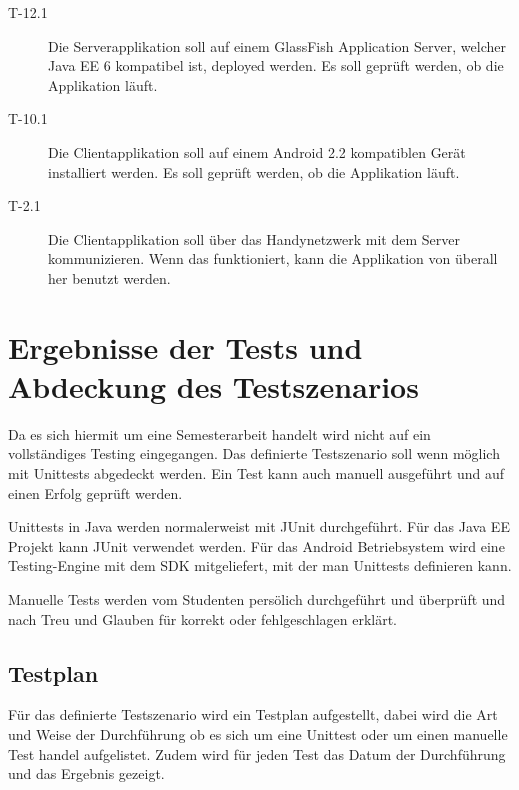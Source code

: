 \documentclass[listof=totocnumbered, bibliography=totocnumbered]{scrreprt}
\begin{document}
\begin{description}
    \item[T-12.1] Die Serverapplikation soll auf einem GlassFish Application
    Server, welcher Java EE 6 kompatibel ist, deployed werden. Es soll geprüft
    werden, ob die Applikation läuft.
         
    \item[T-10.1] Die Clientapplikation soll auf einem Android 2.2
    kompatiblen Gerät installiert werden. Es soll geprüft werden, ob die
    Applikation läuft.
    
    \item[T-2.1] Die Clientapplikation soll über das Handynetzwerk mit dem
    Server kommunizieren. Wenn das funktioniert, kann die Applikation von
    überall her benutzt werden.
    
  \end{description}
  
  \newpage
  
  \section{Ergebnisse der Tests und Abdeckung des Testszenarios}
  
  Da es sich hiermit um eine Semesterarbeit handelt wird nicht auf ein
  vollständiges Testing eingegangen. Das definierte Testszenario soll wenn
  möglich mit Unittests abgedeckt werden. Ein Test kann auch manuell ausgeführt
  und auf einen Erfolg geprüft werden.
  
  Unittests in Java werden normalerweist mit JUnit durchgeführt. Für das Java
  EE Projekt kann JUnit verwendet werden. Für das Android Betriebsystem wird
  eine Testing-Engine mit dem SDK mitgeliefert, mit der man Unittests definieren kann.
  
  Manuelle Tests werden vom Studenten persölich durchgeführt und überprüft und
  nach Treu und Glauben für korrekt oder fehlgeschlagen erklärt.
  
  \subsection{Testplan}
  
  Für das definierte Testszenario wird ein Testplan aufgestellt, dabei wird die
  Art und Weise der Durchführung ob es sich um eine Unittest oder um einen
  manuelle Test handel aufgelistet. Zudem wird für jeden Test das Datum der
  Durchführung und das Ergebnis gezeigt.\\
  \\
\end{document}
